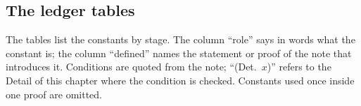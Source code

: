 \subsection{The ledger tables}\label{subsec:ledger-tables}

\providecommand{\ldgfl}[1]{\texttt{#1}}
\newcommand{\ldghead}{\toprule symbol & role & defined & depends on & stage & conditions (imposed; checked) & used at\\ \midrule}

The tables list the constants by stage. The column ``role'' says in words what the constant is; the column ``defined'' names the statement or proof of the note that introduces it. Conditions are quoted from the note; ``(Det.~$x$)'' refers to the Detail of this chapter where the condition is checked. Constants used once inside one proof are omitted.

